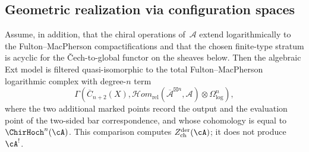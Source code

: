 \subsection{Geometric realization via configuration spaces}

\begin{theorem}
\label{thm:geometric-chiral-hochschild}
Assume, in addition, that the chiral operations of~$\mathcal A$
extend logarithmically to the Fulton--MacPherson compactifications
and that the chosen finite-type stratum is acyclic for the
\v{C}ech-to-global functor on the sheaves below.  Then the algebraic
Ext model is filtered quasi-isomorphic to the total
Fulton--MacPherson logarithmic complex with degree-$n$ term
\[
\Gamma\left(\overline{C}_{n+2}(X),
\mathcal{H}om_{\mathrm{rel}}
(\overline{\mathcal A}^{\boxtimes n},\mathcal A)
\otimes \Omega^n_{\log}\right),
\]
where the two additional marked points record the output and the
evaluation point of the two-sided bar correspondence,
and whose cohomology is equal to $\ChirHoch^n(\cA)$.  This comparison computes
$Z^{\mathrm{der}}_{\mathrm{ch}}(\cA)$; it does not produce
$\cA^!$.
\end{theorem}

